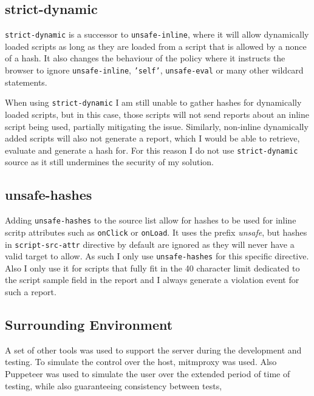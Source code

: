 \subsection{strict-dynamic}

\texttt{strict-dynamic} is a successor to \texttt{unsafe-inline}, where it will allow dynamically loaded scripts as long as they are loaded from a script that is allowed by a nonce of a hash.
It also changes the behaviour of the policy where it instructs the browser to ignore \texttt{unsafe-inline}, \texttt{'self'}, \texttt{unsafe-eval} or many other wildcard statements.

When using \texttt{strict-dynamic} I am still unable to gather hashes for dynamically loaded scripts, but in this case, those scripts will not send reports about an inline script being used, partially mitigating the issue.
Similarly, non-inline dynamically added scripts will also not generate a report, which I would be able to retrieve, evaluate and generate a hash for.
For this reason I do not use \texttt{strict-dynamic} source as it still undermines the security of my solution.

\subsection{unsafe-hashes}

Adding \texttt{unsafe-hashes} to the source list allow for hashes to be used for inline scritp attributes such as \texttt{onClick} or \texttt{onLoad}.
It uses the prefix {\it unsafe}, but hashes in \texttt{script-src-attr} directive by default are ignored as they will never have a valid target to allow.
As such I only use \texttt{unsafe-hashes} for this specific directive. 
Also I only use it for scripts that fully fit in the 40 character limit dedicated to the script sample field in the report and I always generate a violation event for such a report.

\subsection{Surrounding Environment}

A set of other tools was used to support the server during the development and testing.
To simulate the control over the host, mitmproxy was used. 
Also Puppeteer was used to simulate the user over the extended period of time of testing, while also guaranteeing consistency between tests, 

